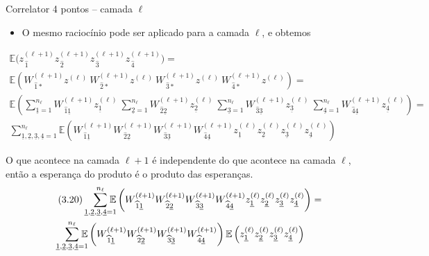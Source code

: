 \documentclass{beamer}
\newcommand{\EE}{\mathbb{E}}
\def\mi#1{{\,\widehat{#1}}}
\def\mj#1{\underline{#1}}
\def\eell{{(\ell)}}
\def\eellum{{(\ell+1)}}
\begin{document}
\begin{frame}{Correlator 4 pontos -- camada $\ell$}
	\begin{itemize}
		\item O mesmo raciocínio pode ser aplicado para a camada $\ell$, e obtemos
	\end{itemize}
	\begin{multline*}\tag{3.20}
		\EE\big(z^\eellum_{\mi1} z^\eellum_{\mi2} z^\eellum_{\mi3} z^\eellum_{\mi4}\big) = \\
		\EE\left(W^\eellum_{\mi1*}z^\eell \ W^\eellum_{\mi2*}z^\eell \ W^\eellum_{\mi3*}z^\eell \ W^\eellum_{\mi4*}z^\eell \right) = \\
		\EE\left(\sum_{\mj1=1}^{n_\ell} W^\eellum_{\mi1\mj1}z^\eell_{\mj1} \ \sum_{\mj2=1}^{n_\ell} W^\eellum_{\mi2\mj2}z^\eell_{\mj2} \
		\sum_{\mj3=1}^{n_\ell} W^\eellum_{\mi3\mj3}z^\eell_{\mj3} \ \sum_{\mj4=1}^{n_\ell} W^\eellum_{\mi4\mj4}z^\eell_{\mj4} \right) = \\
		\sum_{\mj1,\mj2,\mj3,\mj4=1}^{n_\ell} \EE\left(W^\eellum_{\mi1\mj1}W^\eellum_{\mi2\mj2}W^\eellum_{\mi3\mj3}W^\eellum_{\mi4\mj4} z^\eell_{\mj1}z^\eell_{\mj2}z^\eell_{\mj3}z^\eell_{\mj4}\right)
	\end{multline*}
\end{frame}

\begin{frame}
	O que acontece na camada $\ell+1$ é independente do que acontece na camada $\ell$, então a esperança do produto é o produto das esperanças.
	\begin{multline*}\tag{3.20}
		\sum_{\mj1,\mj2,\mj3,\mj4=1}^{n_\ell}\hspace{-2ex}\EE\left(W^\eellum_{\mi1\mj1}W^\eellum_{\mi2\mj2}W^\eellum_{\mi3\mj3}W^\eellum_{\mi4\mj4} z^\eell_{\mj1}z^\eell_{\mj2}z^\eell_{\mj3}z^\eell_{\mj4}\right)
 = \\ \sum_{\mj1,\mj2,\mj3,\mj4=1}^{n_\ell}\hspace{-2ex}\EE\left(W^\eellum_{\mi1\mj1}W^\eellum_{\mi2\mj2}W^\eellum_{\mi3\mj3}W^\eellum_{\mi4\mj4} \right)\EE\left( z^\eell_{\mj1}z^\eell_{\mj2}z^\eell_{\mj3}z^\eell_{\mj4}\right)
	\end{multline*}
\end{frame}
\end{document}
